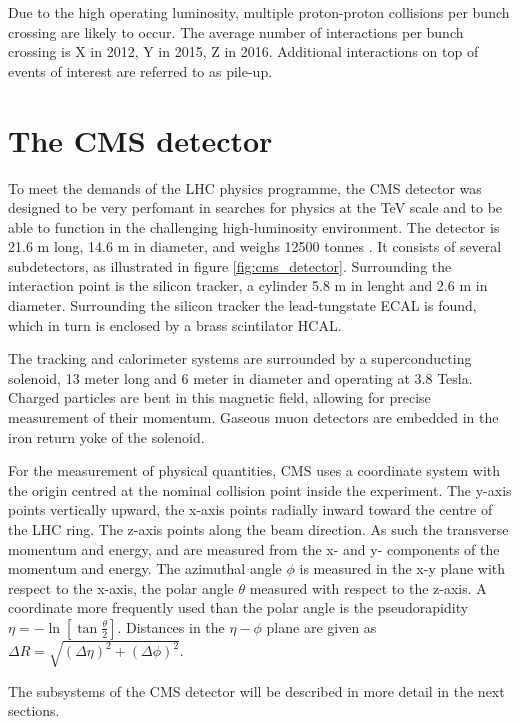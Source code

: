 Due to the high operating luminosity, multiple proton-proton collisions per 
bunch crossing are likely to occur. The average number of interactions
per bunch crossing is X in 2012, Y in 2015, Z in 2016. Additional 
interactions on top of events of interest are referred to as pile-up.

\section{The \acs{CMS} detector}
\label{sec:CMSLHC_CMS}
To meet the demands of the \ac{LHC} physics programme, the
 \ac{CMS} detector was designed to be very perfomant in searches
for physics at the TeV scale and to be able to 
function in the challenging high-luminosity environment.
The detector is 21.6 m long, 14.6 m in diameter, and weighs
12500 tonnes \cite{cms-jinst}. It consists of several subdetectors, as illustrated
in figure \ref{fig:cms_detector}. Surrounding the interaction
point is the silicon tracker, a cylinder 5.8 m in lenght and 2.6 m in 
diameter. Surrounding the silicon tracker
the lead-tungstate \ac{ECAL} is found, which in turn is enclosed
by a brass scintilator \ac{HCAL}. 

The tracking and calorimeter systems are surrounded by a superconducting
solenoid, 13 meter long and 6 meter in diameter and operating at 3.8 Tesla.
Charged particles are bent in this magnetic field, allowing for precise 
measurement of their momentum. Gaseous muon detectors are embedded in the 
iron return yoke of the solenoid.

For the measurement of physical quantities, \ac{CMS} uses a coordinate
system with the origin centred at the nominal collision point
inside the experiment. The y-axis points vertically upward, the x-axis
points radially inward toward the centre of the \ac{LHC} ring. The z-axis
points along the beam direction. As such the transverse momentum and energy, 
\pT and \ET are measured from the x- and y- components of the momentum and energy.
The azimuthal angle $\phi$ is measured in the x-y plane with respect to the x-axis, 
the polar angle $\theta$ measured with respect to the z-axis. A coordinate
more frequently used than the polar angle is the pseudorapidity $\eta = -\ln{[\tan{\frac{\theta}{2}}]}$.
Distances in the $\eta-\phi$ plane are given as $\Delta R = \sqrt{(\Delta\eta)^2+(\Delta\phi)^2}$. 

The subsystems of the \ac{CMS} detector will be described in more detail in the 
next sections.

